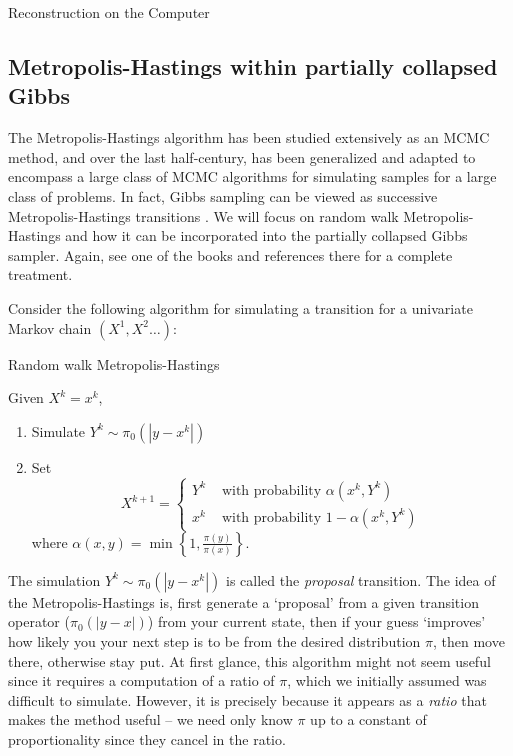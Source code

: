\begin{chapter}{Reconstruction on the Computer}
\subsection{Metropolis-Hastings within partially collapsed Gibbs}
The Metropolis-Hastings algorithm \citep{metropolis1953equation} has been studied extensively as an MCMC method, and over the last half-century, has been generalized and adapted to encompass a large class of MCMC algorithms for simulating samples for a large class of problems. 
In fact, Gibbs sampling can be viewed as successive Metropolis-Hastings transitions \citep{robert2013monte}.  We will focus on random walk Metropolis-Hastings and how it can be incorporated into the partially collapsed Gibbs sampler.
Again, see one of the books \citep{calvetti2007introduction,liu2008monte,robert2013monte} and references there for a complete treatment.

Consider the following algorithm for simulating a transition for a univariate Markov chain $(X^1,X^2\dots)$:
\begin{algorithm}[H]
\caption{Random walk Metropolis-Hastings} \label{alg:metropolis}
Given $X^k = x^{k}$, 
\begin{enumerate}[1.]
  \item Simulate $Y^k \sim \pi_0(|y - x^{k}|)$
  \item Set
  \begin{equation*}
    X^{k+1} = \begin{cases}
      Y^k &\text{ with probability } \alpha(x^{k},Y^k) \\
      x^k &\text{ with probability } 1-\alpha(x^{k},Y^k)
    \end{cases} 
  \end{equation*}
  where $\displaystyle{\alpha(x,y) = \min\left\{1,\frac{\pi(y)}{\pi(x)}\right\}.}$ 
\end{enumerate}
\end{algorithm} 

The simulation $Y^k\sim \pi_0(|y-x^k|)$ is called the \emph{proposal} transition.
The idea of the Metropolis-Hastings is, first generate a `proposal' from a given transition operator ($\pi_0(|y-x|)$) from your current state, then if your guess `improves' how likely you your next step is to be from the desired distribution $\pi$, then move there, otherwise stay put.
At first glance, this algorithm might not seem useful since it requires a computation of a ratio of $\pi$, which we initially assumed was difficult to simulate.
However, it is precisely because it appears as a \emph{ratio} that makes the method useful -- we need only know $\pi$ up to a constant of proportionality since they cancel in the ratio.


\end{chapter}
